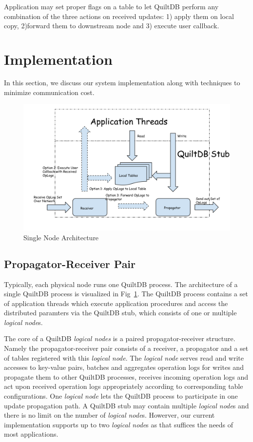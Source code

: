 \documentclass{acm_proc_article-sp}
\begin{document}
Application may set proper flags on a table to let QuiltDB perform any 
combination of the three actions on received updates: 1) apply them on local 
copy, 2)forward them to downstream node and 3) execute user callback.

\section{Implementation}
In this section, we discuss our system implementation along with techniques to 
minimize communication cost.

\begin{figure}[th!]
  \centering
  \includegraphics[width=.5\textwidth]{fig/propagator-receiver.pdf}
  \caption{Single Node Architecture}
  \label{fig:prop-recv}
\end{figure}

\subsection{Propagator-Receiver Pair}

Typically, each physical node runs one QuiltDB process. The architecture of a single 
QuiltDB process is visualized in Fig~\ref{fig:prop-recv}.  The QuiltDB process
contains a set of application threads which execute application procedures and 
access the distributed paramters via the QuiltDB stub, which consists of one 
or multiple \emph{logical node}s.

The core of a QuiltDB \emph{logical nodes} is a paired propagator-receiver 
structure. Namely the propagator-receiver pair consists
of a receiver, a propagator and a set of tables registered with this 
\emph{logical node}. The \emph{logical node} serves read and write accesses to 
key-value pairs, batches and aggregates operation logs for writes and propagate 
them to other QuiltDB processes, receives incoming operation logs and act upon 
received operation logs appropriately according to corresponding table 
configurations. One \emph{logical node} lets the QuiltDB process to participate 
in one update propagation path. A QuiltDB stub may contain multiple 
\emph{logical node}s and there is no limit on the number of \emph{logical 
node}s. Howerver, our current implementation supports up to two \emph{logical 
node}s as that suffices the needs of most applications.
\end{document}
